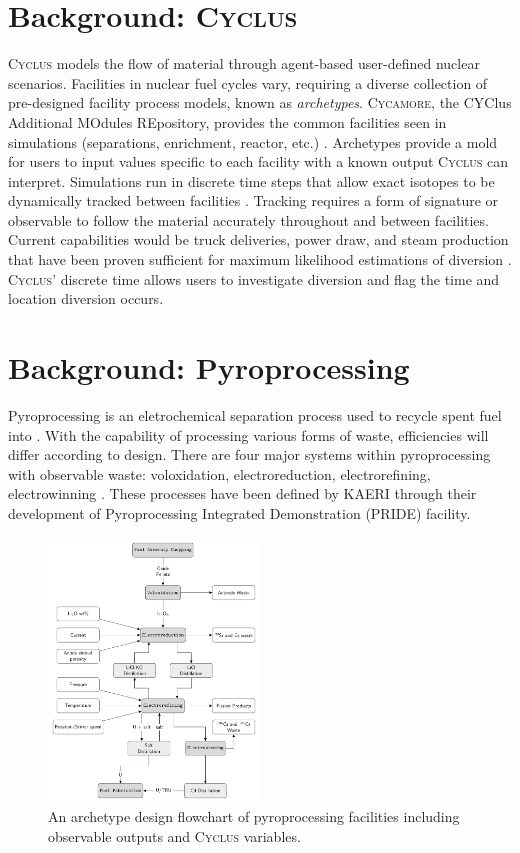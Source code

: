 \documentclass{anstrans}
\newcommand{\Cyclus}{\textsc{Cyclus}\xspace}%
\newcommand{\Cycamore}{\textsc{Cycamore}\xspace}%
\begin{document}
\section{Background: \Cyclus}
\Cyclus models the flow of material through agent-based user-defined nuclear scenarios. Facilities in nuclear fuel cycles vary, requiring a diverse collection of pre-designed facility process models, known as \emph{archetypes}. \Cycamore, the CYClus Additional MOdules REpository, provides the common facilities seen in simulations (separations, enrichment, reactor, etc.) \cite{huff_extensions_2014}. Archetypes provide a mold for users to input values specific to each facility with a known output \Cyclus can interpret. Simulations run in discrete time steps that allow exact isotopes to be dynamically tracked between facilities \cite{huff_fundamental_2016}. Tracking requires a form of signature or observable to follow the material accurately throughout and between facilities. Current capabilities would be truck deliveries, power draw, and steam production that have been proven sufficient for maximum likelihood estimations of diversion \cite{Hou_2016,Yilmaz_2016}.
\Cyclus' discrete time allows users to investigate diversion and flag the time and location diversion occurs.

\section{Background: Pyroprocessing}
Pyroprocessing is an eletrochemical separation process used to recycle spent fuel into . With the capability of processing various forms of waste, efficiencies will differ according to design. There are four major systems within pyroprocessing with observable waste: voloxidation, electroreduction, electrorefining, electrowinning \cite{Borrelli_2017}. These processes have been defined by KAERI through their development of Pyroprocessing Integrated Demonstration (PRIDE) facility. 

\begin{figure}[ht] %
	\centering
	\includegraphics[width=0.5\textwidth]{flowchart}
	\caption{An archetype design flowchart of pyroprocessing facilities including observable outputs and \Cyclus variables.}
	\label{fig:flowchart}
\end{figure}
\end{document}
